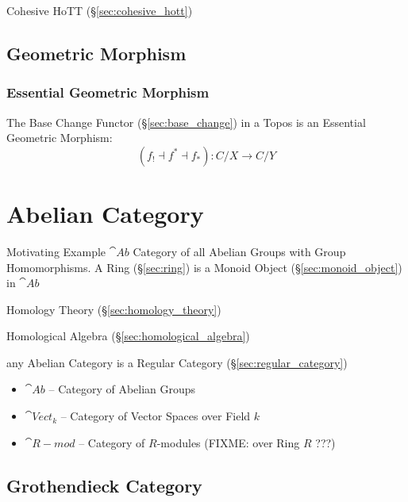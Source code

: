 Cohesive HoTT (\S\ref{sec:cohesive_hott})



\subsection{Geometric Morphism}\label{sec:geometric_morphism}

\subsubsection{Essential Geometric Morphism}
\label{sec:essential_geometric}

The Base Change Functor (\S\ref{sec:base_change}) in a Topos is an
Essential Geometric Morphism:
\[
  (f_! \dashv f^* \dashv f_*):C/X \rightarrow C/Y
\]



\section{Abelian Category}\label{sec:abelian_category}

Motivating Example $\cat{Ab}$ Category of all Abelian Groups with
Group Homomorphisms. A Ring (\S\ref{sec:ring}) is a Monoid Object
(\S\ref{sec:monoid_object}) in $\cat{Ab}$

Homology Theory (\S\ref{sec:homology_theory})

Homological Algebra (\S\ref{sec:homological_algebra})

any Abelian Category is a Regular Category
(\S\ref{sec:regular_category})

\begin{itemize}
  \item $\cat{Ab}$ -- Category of Abelian Groups
  \item $\cat{Vect}_k$ -- Category of Vector Spaces over Field $k$
  \item $\cat{R-mod}$ -- Category of $R$-modules (FIXME: over Ring $R$ ???)
\end{itemize}



\subsection{Grothendieck Category}\label{sec:grothendieck_category}


